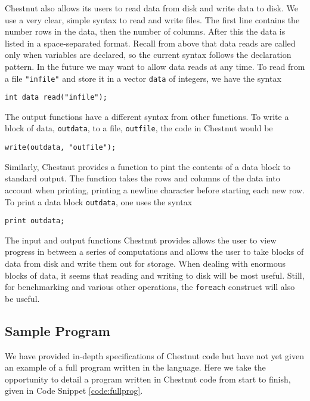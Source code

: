 \documentclass[twocolumn]{article}
\renewcommand{\|}{\origbar} %
\newcommand{\code}[1]{\texttt{#1}}
\begin{document}
Chestnut also allows its users to read data from disk and write data to disk. We use a very clear, simple syntax to read and write files. The first line contains the number rows in the data, then the number of columns. After this the data is listed in a space-separated format. Recall from above that data reads are called only when variables are declared, so the current syntax follows the declaration pattern. In the future we may want to allow data reads at any time. To read from a file \code{"infile"} and store it in a vector \code{data} of integers, we have the syntax
\begin{center}
  \code{int data read("infile");}
\end{center}

The output functions have a different syntax from other functions. To write a block of data, \code{outdata}, to a file, \code{outfile}, the code in Chestnut would be
\begin{center}
  \code{write(outdata, "outfile");}
\end{center}

Similarly, Chestnut provides a function to pint the contents of a data block to standard output. The function takes the rows and columns of the data into account when printing, printing a newline character before starting each new row. To print a data block \code{outdata}, one uses the syntax
\begin{center}
  \code{print outdata;}
\end{center}

The input and output functions Chestnut provides allows the user to view progress in between a series of computations and allows the user to take blocks of data from disk and write them out for storage. When dealing with enormous blocks of data, it seems that reading and writing to disk will be most useful. Still, for benchmarking and various other operations, the \code{foreach} construct will also be useful.

\subsection{Sample Program}


We have provided in-depth specifications of Chestnut code but have not yet given an example of a full program written in the language. Here we take the opportunity to detail a program written in Chestnut code from start to finish, given in Code Snippet \ref{code:fullprog}.
\end{document}
